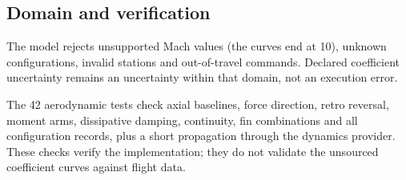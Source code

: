 \subsection{Domain and verification}

The model rejects unsupported Mach values (the curves end at 10), unknown configurations, invalid stations and out-of-travel commands. Declared coefficient uncertainty remains an uncertainty within that domain, not an execution error.

The 42 aerodynamic tests check axial baselines, force direction, retro reversal, moment arms, dissipative damping, continuity, fin combinations and all configuration records, plus a short propagation through the dynamics provider. These checks verify the implementation; they do not validate the unsourced coefficient curves against flight data.
